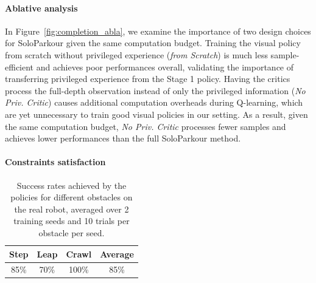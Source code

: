 \paragraph{Ablative analysis}
In Figure~\ref{fig:completion_abla}, we examine the importance of two design choices for SoloParkour given the same computation budget.
Training the visual policy from scratch without privileged experience (\textit{from Scratch}) is much less sample-efficient and achieves poor performances overall, validating the importance of transferring privileged experience from the Stage 1 policy.
Having the critics process the full-depth observation instead of only the privileged information (\textit{No Priv. Critic}) causes additional computation overheads during Q-learning, which are yet unnecessary to train good visual policies in our setting.
As a result, given the same computation budget, \textit{No Priv. Critic} processes fewer samples and achieves lower performances than the full SoloParkour method. 


\paragraph{Constraints satisfaction}

\begin{table} 
    \vspace{-0.5cm}
    \centering
    \begin{tabular}{c|c|c|c}
        \toprule
        Step & Leap & Crawl & Average\\
        \midrule
        85\% & 70\% & 100\% & 85\% \\
        \bottomrule
    \end{tabular}
    \caption{Success rates achieved by the policies for different obstacles on the real robot, averaged over 2 training seeds and 10 trials per obstacle per seed.}
    \label{table:results}
\end{table}

